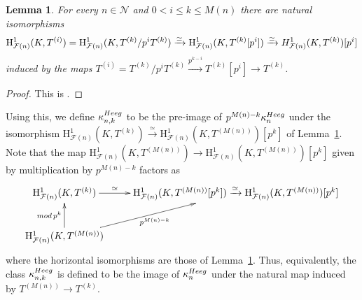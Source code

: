 \documentclass[10pt,reqno]{amsart}
\numberwithin{equation}{section}
\theoremstyle{plain}
\theoremstyle{definition}
\newtheorem{rmk}[thm]{Remark}
\theoremstyle{definition}
\theoremstyle{plain}
\theoremstyle{plain}
\newtheorem{lemma}[thm]{Lemma}
\theoremstyle{plain}
\theoremstyle{plain}
\theoremstyle{plain}
\theoremstyle{plain}
\newcommand{\Fcal}{\mathcal{F}}
\newcommand{\cN}{\mathcal{N}}
\newcommand{\rH}{\mathrm{H}}
\begin{document}
\begin{lemma}\label{lemmamod} 
For every $n\in\cN$ and $0< i\leq k\leq M(n)$ there are natural isomorphisms
\begin{equation}\label{eq2}
\rH^1_{\Fcal(n)}(K,T^{(i)}) = \rH^1_{\Fcal(n)}(K,T^{(k)}/p^iT^{(k)})\xrightarrow{\simeq}\rH^1_{\Fcal(n)}(K,T^{(k)}[p^i])\xrightarrow{\simeq}{\rm H}_{\Fcal(n)}^1(K,T^{(k)})[p^i]\nonumber
\end{equation}
induced by the maps $T^{(i)} = T^{(k)}/p^iT^{(k)}\xrightarrow{p^{k-i}}T^{(k)}[p^i]\rightarrow T^{(k)}$.
\end{lemma}

\begin{proof}
This is \cite[Lem.~3.3.1]{eisenstein}.
\end{proof}

Using this, we define $\kappa_{n,k}^{\rm Heeg}$ to be the pre-image of $p^{M(n)-k}\kappa_{n}^{\rm Heeg}$ under the isomorphism $\rH^1_{\Fcal(n)}(K,T^{(k)})\xrightarrow{\simeq} \rH^1_{\Fcal(n)}(K,T^{(M(n))})[p^k]$ of Lemma~\ref{lemmamod}. Note that the map $\rH^1_{\Fcal(n)}(K,T^{(M(n))})\rightarrow\rH^1_{\Fcal(n)}(K,T^{(M(n))})[p^k]$ given by multiplication by $p^{M(n)-k}$ factors as
\[
\xymatrix{
\rH^1_{\Fcal(n)}(K,T^{(k)})\ar[r]^-{\simeq}&\rH^1_{\Fcal(n)}(K,T^{(M(n))}[p^k])\xrightarrow{\simeq}\rH^1_{\Fcal(n)}(K,T^{(M(n))})[p^k]\\
\rH^1_{\Fcal(n)}(K,T^{(M(n))})\ar[u]^-{{\rm mod}\,p^k}\ar[ur]_{p^{M(n)-k}}&
}
\]
where the horizontal isomorphisms are those of  Lemma~\ref{lemmamod}. Thus, equivalently, the class $\kappa_{n,k}^{\rm Heeg}$ is defined to be the image of $\kappa_{n}^{\rm Heeg}$ under the natural map induced by $T^{(M(n))}\rightarrow T^{(k)}$.




\end{document}

